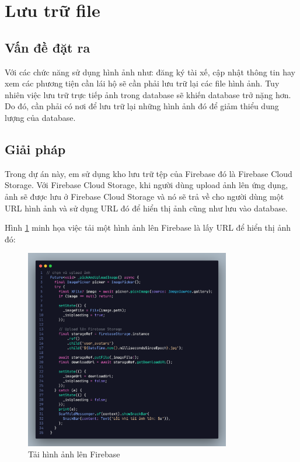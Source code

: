 \documentclass[../DoAn.tex]{subfiles}
\begin{document}
\section{Lưu trữ file}
\label{section:5.1}

\subsection{Vấn đề đặt ra}
\label{subsection:5.1.1}
Với các chức năng sử dụng hình ảnh như: đăng ký tài xế, cập nhật thông tin hay xem các phương tiện cần lái hộ sẽ cần phải lưu trữ lại các file hình ảnh.
Tuy nhiên việc lưu trữ trực tiếp ảnh trong database sẽ khiến database trở nặng hơn. 
Do đó, cần phải có nơi để lưu trữ lại những hình ảnh đó để giảm thiểu dung lượng của database.

\subsection{Giải pháp}
\label{subsection:5.1.2}
Trong dự án này, em sử dụng kho lưu trữ tệp của Firebase đó là Firebase Cloud Storage.
Với Firebase Cloud Storage, khi người dùng upload ảnh lên ứng dụng, ảnh sẽ được lưu ở Firebase Cloud Storage và nó sẽ trả về 
cho người dùng một URL hình ảnh và sử dụng URL đó để hiển thị ảnh cũng như lưu vào database.

Hình \ref{fig:Upload_anh_len_firebase} minh họa việc tải một hình ảnh lên Firebase là lấy URL để hiển thị ảnh đó:

\begin{figure}[H]
  \centering
  \includegraphics[width=0.8\textwidth]{Hinhve/Upload_anh_len_firebase.png}
  \caption{Tải hình ảnh lên Firebase}
  \label{fig:Upload_anh_len_firebase}
\end{figure}
\end{document}
